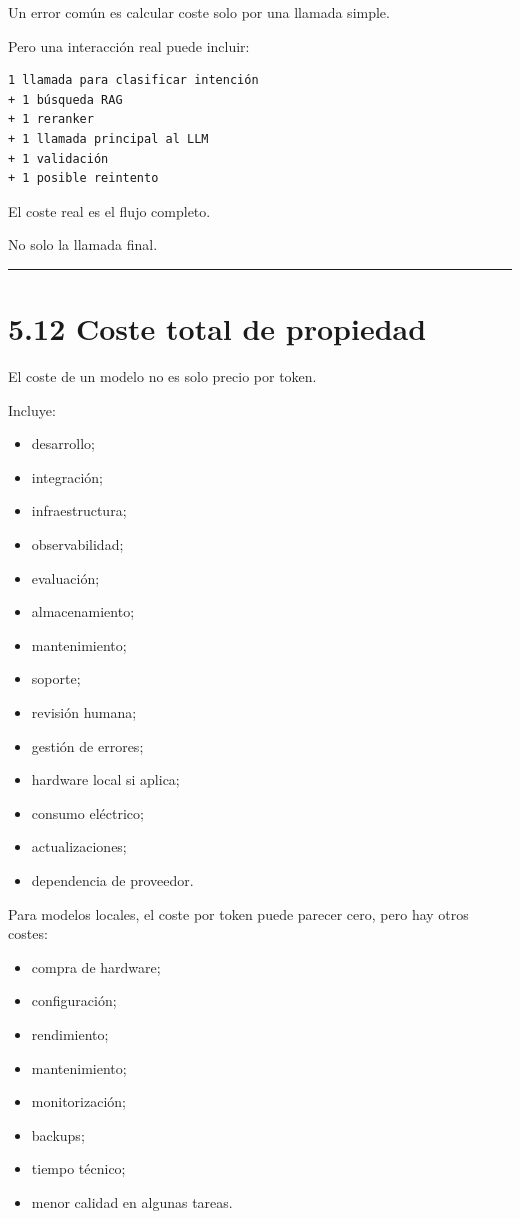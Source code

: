Un error común es calcular coste solo por una llamada simple.

Pero una interacción real puede incluir:

\begin{lstlisting}
1 llamada para clasificar intención
+ 1 búsqueda RAG
+ 1 reranker
+ 1 llamada principal al LLM
+ 1 validación
+ 1 posible reintento
\end{lstlisting}

El coste real es el flujo completo.

No solo la llamada final.

\begin{center}\rule{0.5\linewidth}{0.5pt}\end{center}

\section{5.12 Coste total de propiedad}\label{coste-total-de-propiedad}

El coste de un modelo no es solo precio por token.

Incluye:

\begin{itemize}
\tightlist
\item
  desarrollo;
\item
  integración;
\item
  infraestructura;
\item
  observabilidad;
\item
  evaluación;
\item
  almacenamiento;
\item
  mantenimiento;
\item
  soporte;
\item
  revisión humana;
\item
  gestión de errores;
\item
  hardware local si aplica;
\item
  consumo eléctrico;
\item
  actualizaciones;
\item
  dependencia de proveedor.
\end{itemize}

Para modelos locales, el coste por token puede parecer cero, pero hay
otros costes:

\begin{itemize}
\tightlist
\item
  compra de hardware;
\item
  configuración;
\item
  rendimiento;
\item
  mantenimiento;
\item
  monitorización;
\item
  backups;
\item
  tiempo técnico;
\item
  menor calidad en algunas tareas.
\end{itemize}

